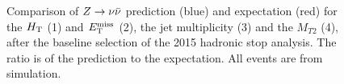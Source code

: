 \begin{figure}[h]
{}
\caption{Comparison of $Z\rightarrow \nu\bar{\nu}$ prediction (blue) and expectation (red) for the $H_{\rm T}$ (1) and $E_{\text{T}}^{\rm miss}$ (2), the jet multiplicity (3) and the $M_{T2}$ (4), after the baseline selection of the 2015 hadronic stop analysis. The ratio is of the prediction to the expectation. All events are from simulation.}
\label{fig:ZInvBaseline_MetHtNjMt2}
\end{figure}

